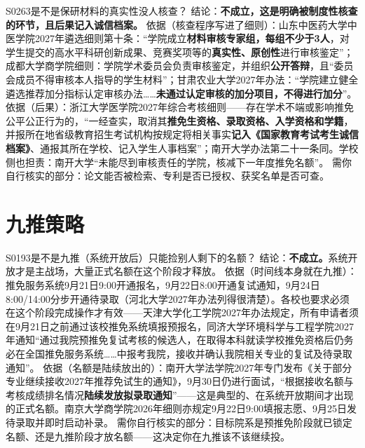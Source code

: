 \begin{qa}{S0263}{是不是保研材料的真实性没人核查？}
结论：\textbf{不成立，这是明确被制度性核查的环节，且后果记入诚信档案。}
依据（核查程序写进了细则）：山东中医药大学中医学院2027年遴选细则第十条：“学院成立\textbf{材料审核专家组，每组不少于3人}，对学生提交的高水平科研创新成果、竞赛奖项等的\textbf{真实性、原创性}进行审核鉴定”；成都大学商学院细则：学院学术委员会负责审核鉴定，并组织\textbf{公开答辩}，且“委员会成员不得审核本人指导的学生材料”；甘肃农业大学2027年办法：“学院建立健全遴选推荐加分指标认定审核办法……\textbf{未通过认定审核的加分项目，不得进行加分}”。
依据（后果）：浙江大学医学院2027年综合考核细则——存在学术不端或影响推免公平公正行为的，“一经查实，取消其\textbf{推免生资格、录取资格、入学资格和学籍}，并报所在地省级教育招生考试机构按规定将相关事实\textbf{记入《国家教育考试考生诚信档案》}、通报其所在学校、记入学生人事档案”；南开大学办法第二十一条同。学校侧也担责：南开大学“未能尽到审核责任的学院，核减下一年度推免名额”。
需你自行核实的部分：论文能否被检索、专利是否已授权、获奖名单是否可查。
\end{qa}

\section{九推策略}
\begin{qa}{S0193}{是不是九推（系统开放后）只能捡别人剩下的名额？}
结论：\textbf{不成立。}系统开放才是主战场，大量正式名额在这个阶段才释放。
依据（时间线本身就在九推）：推免服务系统9月21日9:00开通报名，9月22日8:00开通复试通知，9月24日8:00/14:00分步开通待录取（河北大学2027年办法列得很清楚）。各校也要求必须在这个阶段完成操作才有效——天津大学化工学院2027年办法规定，所有申请者须在9月21日之前通过该校推免系统填报预报名，同济大学环境科学与工程学院2027年通知“通过我院预推免复试考核的候选人，在取得本科就读学校推免资格后仍务必在全国推免服务系统……中报考我院，接收并确认我院相关专业的复试及待录取通知”。
依据（名额是陆续放出的）：南开大学法学院2027年专门发布《关于部分专业继续接收2027年推荐免试生的通知》，9月30日仍进行面试，“根据接收名额与考核成绩排名情况\textbf{陆续发放拟录取通知}”——这是典型的、在系统开放期间才出现的正式名额。南京大学商学院2026年细则亦规定9月22日9:00填报志愿、9月25日发待录取并即时启动补录。
需你自行核实的部分：目标院系是预推免阶段就已锁定名额、还是九推阶段才放名额——这决定你在九推该不该继续投。
\end{qa}

